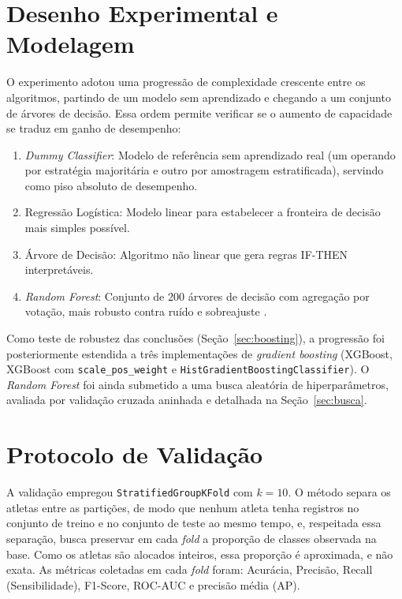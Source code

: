 \section{Desenho Experimental e Modelagem}
\label{sec:desenho}
O experimento adotou uma progressão de complexidade crescente entre os algoritmos, partindo de um modelo sem aprendizado e chegando a um conjunto de árvores de decisão. Essa ordem permite verificar se o aumento de capacidade se traduz em ganho de desempenho:
\begin{enumerate}
    \item \textit{Dummy Classifier}: Modelo de referência sem aprendizado real (um operando por estratégia majoritária e outro por amostragem estratificada), servindo como piso absoluto de desempenho.
    \item Regressão Logística: Modelo linear para estabelecer a fronteira de decisão mais simples possível.
    \item Árvore de Decisão: Algoritmo não linear que gera regras IF-THEN interpretáveis.
    \item \textit{Random Forest}: Conjunto de 200 árvores de decisão com agregação por votação, mais robusto contra ruído e sobreajuste \cite{breiman2001}.
\end{enumerate}

Como teste de robustez das conclusões (Seção~\ref{sec:boosting}), a progressão foi posteriormente estendida a três implementações de \textit{gradient boosting} (XGBoost, XGBoost com \texttt{scale\_pos\_weight} e \texttt{HistGradient\allowbreak Boosting\allowbreak Classifier}). O \textit{Random Forest} foi ainda submetido a uma busca aleatória de hiperparâmetros, avaliada por validação cruzada aninhada e detalhada na Seção~\ref{sec:busca}.

\section{Protocolo de Validação}
A validação empregou \texttt{StratifiedGroupKFold} com $k=10$. O método separa os atletas entre as partições, de modo que nenhum atleta tenha registros no conjunto de treino e no conjunto de teste ao mesmo tempo, e, respeitada essa separação, busca preservar em cada \textit{fold} a proporção de classes observada na base. Como os atletas são alocados inteiros, essa proporção é aproximada, e não exata. As métricas coletadas em cada \textit{fold} foram: Acurácia, Precisão, Recall (Sensibilidade), F1-Score, ROC-AUC e precisão média (AP).

